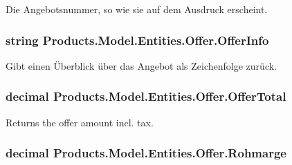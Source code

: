 Die Angebotsnummer, so wie sie auf dem Ausdruck erscheint. 

\subsubsection[{\texorpdfstring{Offer\+Info}{OfferInfo}}]{\setlength{\rightskip}{0pt plus 5cm}string Products.\+Model.\+Entities.\+Offer.\+Offer\+Info\hspace{0.3cm}{\ttfamily [get]}}\hypertarget{class_products_1_1_model_1_1_entities_1_1_offer_a1434edf08f08dfd5d6502afa74527ff2}{}\label{class_products_1_1_model_1_1_entities_1_1_offer_a1434edf08f08dfd5d6502afa74527ff2}


Gibt einen Überblick über das Angebot als Zeichenfolge zurück. 

\subsubsection[{\texorpdfstring{Offer\+Total}{OfferTotal}}]{\setlength{\rightskip}{0pt plus 5cm}decimal Products.\+Model.\+Entities.\+Offer.\+Offer\+Total\hspace{0.3cm}{\ttfamily [get]}}\hypertarget{class_products_1_1_model_1_1_entities_1_1_offer_a8f050d1a46bb57af13471a9185b98f51}{}\label{class_products_1_1_model_1_1_entities_1_1_offer_a8f050d1a46bb57af13471a9185b98f51}


Returns the offer amount incl. tax. 

\subsubsection[{\texorpdfstring{Rohmarge}{Rohmarge}}]{\setlength{\rightskip}{0pt plus 5cm}decimal Products.\+Model.\+Entities.\+Offer.\+Rohmarge\hspace{0.3cm}{\ttfamily [get]}}\hypertarget{class_products_1_1_model_1_1_entities_1_1_offer_a25ba7044c71085b810db11fa8cfcb284}{}\label{class_products_1_1_model_1_1_entities_1_1_offer_a25ba7044c71085b810db11fa8cfcb284}


